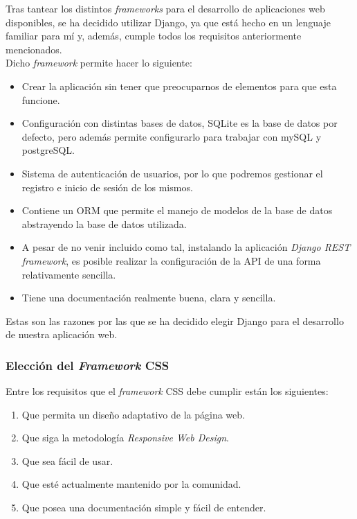     Tras tantear los distintos \textit{frameworks} para el desarrollo de aplicaciones web
    disponibles, se ha decidido utilizar Django, ya que está hecho en un lenguaje familiar
    para mí y, además, cumple todos los requisitos anteriormente mencionados.\\

    Dicho \textit{framework} permite hacer lo siguiente:
        
        \begin{itemize}
            \item Crear la aplicación sin tener que preocuparnos de elementos para que
            esta funcione.
            \item Configuración con distintas bases de datos, SQLite es la base de datos
            por defecto, pero además permite configurarlo para trabajar con mySQL y
            postgreSQL.
            \item Sistema de autenticación de usuarios, por lo que podremos gestionar el
            registro e inicio de sesión de los mismos.
            \item Contiene un ORM que permite el manejo de modelos de la base de datos
            abstrayendo la base de datos utilizada.
            \item A pesar de no venir incluido como tal, instalando la aplicación
            \textit{Django REST framework}, es posible realizar la configuración de la API
            de una forma relativamente sencilla.
            \item Tiene una documentación realmente buena, clara y sencilla.
        \end{itemize}
    
    Estas son las razones por las que se ha decidido elegir Django para el desarrollo de
    nuestra aplicación web.

    \subsubsection{Elección del \textit{Framework} CSS}
    Entre los requisitos que el \textit{framework} CSS debe cumplir están los siguientes:

        \begin{enumerate}
            \item Que permita un diseño adaptativo de la página web.
            \item Que siga la metodología \textit{Responsive Web Design}.
            \item Que sea fácil de usar.
            \item Que esté actualmente mantenido por la comunidad.
            \item Que posea una documentación simple y fácil de entender. 
        \end{enumerate}

